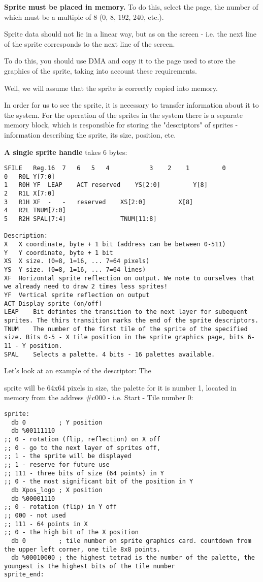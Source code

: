 \documentclass{article}
\begin{document}
\textbf{Sprite must be placed in memory. }To do this, select the page,
the number of which must be a multiple of 8 (0, 8, 192, 240, etc.).

Sprite data should not lie in a linear way, but as on the screen -
i.e. the next line of the sprite corresponds to the next line of the
screen.

To do this, you should use DMA and copy it to the page used to store
the graphics of the sprite, taking into account these requirements.

Well, we will assume that the sprite is correctly copied into memory.

In order for us to see the sprite, it is necessary to transfer
information about it to the system. For the operation of the sprites
in the system there is a separate memory block, which is responsible
for storing the "descriptors" of sprites - information describing the
sprite, its size, position, etc.

\textbf{A single sprite handle} takes 6 bytes:

\begin{verbatim}
SFILE	Reg.16	7	6	5	4	        3    2    1        	0
0	R0L	Y[7:0]
1	R0H	YF	LEAP	ACT	reserved	YS[2:0]			Y[8]
2	R1L	X[7:0]
3	R1H	XF	-	-	reserved	XS[2:0]			X[8]
4	R2L	TNUM[7:0]
5	R2H	SPAL[7:4]				TNUM[11:8]

Description:
X	X coordinate, byte + 1 bit (address can be between 0-511)
Y	Y coordinate, byte + 1 bit
XS	X size. (0=8, 1=16, ... 7=64 pixels)
YS	Y size. (0=8, 1=16, ... 7=64 lines)
XF	Horizontal sprite reflection on output. We note to ourselves that we already need to draw 2 times less sprites!
YF	Vertical sprite reflection on output
ACT	Display sprite (on/off)
LEAP	Bit defintes the transition to the next layer for subequent sprites. The thirs transition marks the end of the sprite descriptors.
TNUM	The number of the first tile of the sprite of the specified size. Bits 0-5 - X tile position in the sprite graphics page, bits 6-11 - Y position.
SPAL	Selects a palette. 4 bits - 16 palettes available.
\end{verbatim}

Let's look at an example of the descriptor: The

sprite will be 64x64 pixels in size, the palette for it is number 1,
located in memory from the address \#c000 - i.e. Start - Tile number
0:

\begin{verbatim}
sprite:
  db 0         ; Y position
  db %00111110
;; 0 - rotation (flip, reflection) on X off
;; 0 - go to the next layer of sprites off,
;; 1 - the sprite will be displayed
;; 1 - reserve for future use
;; 111 - three bits of size (64 points) in Y
;; 0 - the most significant bit of the position in Y
  db Xpos_logo ; X position
  db %00001110
;; 0 - rotation (flip) in Y off
;; 000 - not used
;; 111 - 64 points in X
;; 0 - the high bit of the X position
  db 0         ; tile number on sprite graphics card. countdown from the upper left corner, one tile 8x8 points.
  db %00010000 ; the highest tetrad is the number of the palette, the youngest is the highest bits of the tile number
sprite_end:
\end{verbatim}
\end{document}

